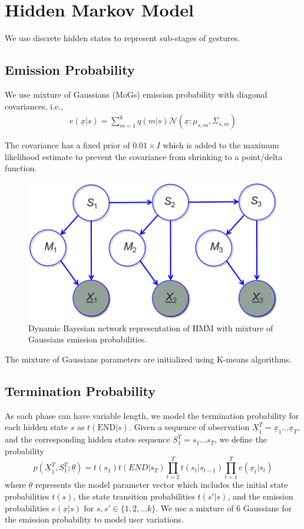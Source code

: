 \section{Hidden Markov Model}
We use discrete hidden states to represent sub-stages of gestures.

\subsection{Emission Probability}
We use mixture of Gaussians (MoGs) emission probability with diagonal
covariances, i.e.,
\begin{align}
e(\underline{x} | s) = \sum_{m=1}^k q(m | s)\mathcal{N}(\underline{x};
\mu_{s,m}, \Sigma_{s, m})
\end{align}

The covariance has a fixed prior of $0.01\times I$ which is added to the maximum likelihood
estimate to prevent the covariance from shrinking to a point/delta function.

\begin{figure}
\centering
\includegraphics[width=0.5\columnwidth]{figures/mog.png}
\caption{Dynamic Bayesian network representation of HMM with mixture of
Gaussians emission probabilities.}
\end{figure}

The mixture of Gaussians parameters are initialized using K-means algorithms.
\subsection{Termination Probability}
As each phase can have variable length, we model the termination probability for each
hidden state $s$ as $t(\text{END}|s)$. Given a sequence of observation $\underline{X}_1^T = \underline{x}_1\ldots\underline{x}_T$, and 
the corresponding hidden states sequence $S_1^T = s_1\ldots s_T$, we define the probability
\begin{displaymath}
p(\underline{X}_1^T, S_1^T;\underline{\theta}) = 
    t(s_1)t(END|s_T)\prod_{t = 2}^T t(s_t | s_{t-1})\prod_{t = 1}^T e(\underline{x}_t|s_t)
\end{displaymath}
where $\underline{\theta}$ represents the model parameter vector which includes
the initial state probabilities $t(s)$, the state transition probabilities $t(s'|s)$, and the 
emission probabilities $e(\underline{x}|s)$ for $s, s'\in \{1, 2,\ldots k\}$. 
We use a mixture of 6 Gaussians for the emission probability to model user variations.

